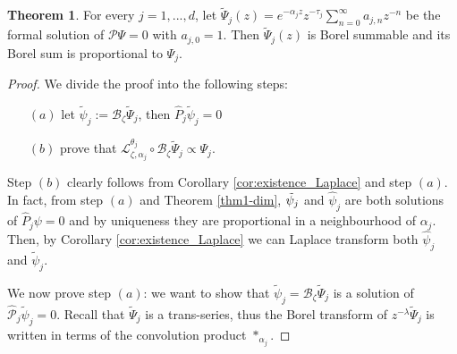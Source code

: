 \documentclass{article}
\theoremstyle{definition}
\newcommand{\series}[1]{\tilde{#1}}
\newcommand{\laplace}{\mathcal{L}}
\newcommand{\borel}{\mathcal{B}}
\newtheorem{theorem}{Theorem}[section]
\begin{document}
\begin{theorem}\label{thm2-dim}
For every $j=1,...,d$, let $\tilde{\Psi}_j(z)=e^{-\alpha_j z}z^{-\tau_j}\sum_{n=0}^{\infty}a_{j,n}z^{-n}$ be the formal solution of $\mathcal{P}\Psi=0$ with $a_{j,0}=1$. Then $\series{\Psi}_j(z)$ is Borel summable and its Borel sum is proportional to $\Psi_j$. 
\end{theorem}
\begin{proof}
We divide the proof into the following steps:
\begin{itemize}
\item[$(a)$] let $\series{\psi}_j:=\borel_{\zeta}\series{\Psi}_j$, then $\hat{P}_j\series{\psi}_j=0$
\item[$(b)$] prove that $\laplace_{\zeta,\alpha_j}^{\theta_j}\circ\borel_\zeta\series{\Psi}_j\propto \Psi_j $. 
\end{itemize}

Step $(b)$ clearly follows from Corollary \ref{cor:existence_Laplace} and step $(a)$. In fact, from step $(a)$ and Theorem \ref{thm1-dim}, $\Tilde{\psi}_j$ and $\hat{\psi}_j$ are both solutions of $\hat{P}_j\psi=0$ and by uniqueness they are proportional in a neighbourhood of $\alpha_j$. Then, by Corollary \ref{cor:existence_Laplace} we can Laplace transform both $\hat{\psi}_j$ and $\tilde{\psi}_j$. 

We now prove step $(a)$: we want to show that $\series{\psi}_j=\borel_{\zeta}\series{\Psi}_j$ is a solution of $\hat{\mathcal{P}}_j\series{\psi}_j=0$. Recall that $\tilde{\Psi}_j$ is a trans-series, thus the Borel transform of $z^{-\lambda}\tilde{\Psi}_j$ is written in terms of the convolution product $\ast_{\alpha_j}$.   





\end{proof}
\end{document}
